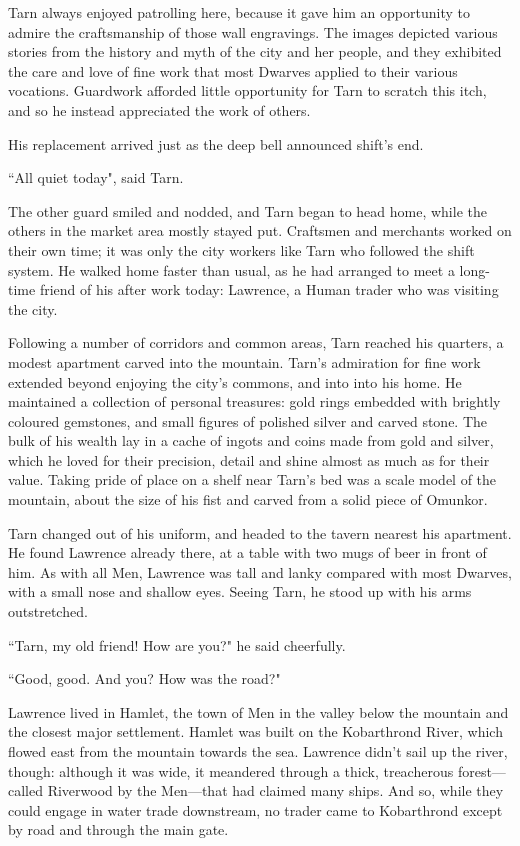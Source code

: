 Tarn always enjoyed patrolling here, because it gave him an opportunity to admire the craftsmanship of those wall engravings.  The images depicted various stories from the history and myth of the city and her people, and they exhibited the care and love of fine work that most Dwarves applied to their various vocations.  Guardwork afforded little opportunity for Tarn to scratch this itch, and so he instead appreciated the work of others.

His replacement arrived just as the deep bell announced shift's end.

``All quiet today", said Tarn.

The other guard smiled and nodded, and Tarn began to head home, while the others in the market area mostly stayed put.  Craftsmen and merchants worked on their own time; it was only the city workers like Tarn who followed the shift system.  He walked home faster than usual, as he had arranged to meet a long-time friend of his after work today: Lawrence, a Human trader who was visiting the city.

Following a number of corridors and common areas, Tarn reached his quarters, a modest apartment carved into the mountain.
Tarn's admiration for fine work extended beyond enjoying the city's commons, and into into his home.  He maintained a collection of personal treasures: gold rings embedded with brightly coloured gemstones, and small figures of polished silver and carved stone.  The bulk of his wealth lay in a cache of ingots and coins made from gold and silver, which he loved for their precision, detail and shine almost as much as for their value.  Taking pride of place on a shelf near Tarn's bed was a scale model of the mountain, about the size of his fist and carved from a solid piece of Omunkor.

Tarn changed out of his uniform, and headed to the tavern nearest his apartment.  He found Lawrence already there, at a table with two mugs of beer in front of him.  As with all Men, Lawrence was tall and lanky compared with most Dwarves, with a small nose and shallow eyes.  Seeing Tarn, he stood up with his arms outstretched.

``Tarn, my old friend!  How are you?" he said cheerfully.

``Good, good.  And you?  How was the road?"

Lawrence lived in Hamlet, the town of Men in the valley below the mountain and the closest major settlement.  Hamlet was built on the Kobarthrond River, which flowed east from the mountain towards the sea.  Lawrence didn't sail up the river, though: although it was wide, it meandered through a thick, treacherous forest---called Riverwood by the Men---that had claimed many ships.  And so, while they could engage in water trade downstream, no trader came to Kobarthrond except by road and through the main gate.

